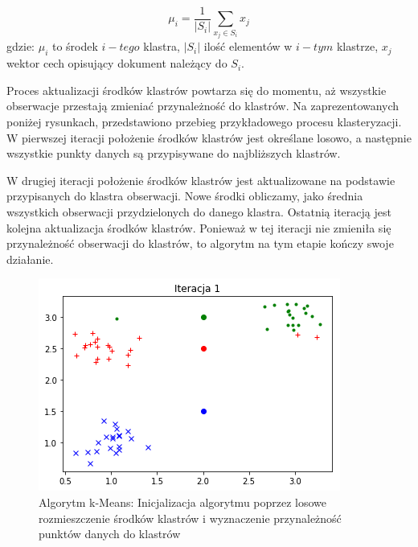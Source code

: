     \begin{equation}
        \mu_i = \frac{1}{|S_i|} \sum_{x_j \in S_i} x_j
        \label{eqn:kmeans_update_step}
    \end{equation}
    gdzie: $\mu_i$ to środek $i-tego$ klastra, $|S_i|$  ilość elementów w $i-tym$ klastrze, $x_j$ wektor cech opisujący dokument należący do $S_i$.
    
    Proces aktualizacji środków klastrów powtarza się do momentu, aż wszystkie obserwacje przestają zmieniać przynależność do klastrów. Na zaprezentowanych poniżej rysunkach, przedstawiono przebieg przykładowego procesu klasteryzacji. W pierwszej iteracji położenie środków klastrów jest określane losowo, a następnie wszystkie punkty danych są przypisywane do najbliższych klastrów.
    
    W drugiej iteracji położenie środków klastrów jest aktualizowane na podstawie przypisanych do klastra obserwacji. Nowe środki obliczamy, jako średnia wszystkich obserwacji przydzielonych do danego klastra. 
    Ostatnią iteracją jest kolejna aktualizacja środków klastrów. Ponieważ w tej iteracji nie zmieniła się przynależność obserwacji do klastrów, to algorytm na tym etapie kończy swoje działanie.
    
    \begin{figure}[h!]
        \centering
        \includegraphics[width=0.6\linewidth]{Rysunki/Rozdzial2/iteracja1.png}
        \caption{Algorytm k-Means: Inicjalizacja algorytmu poprzez losowe rozmieszczenie środków klastrów i wyznaczenie przynależność punktów danych do klastrów}
        \label{fig:kmeans:iteration01}
    \end{figure}

